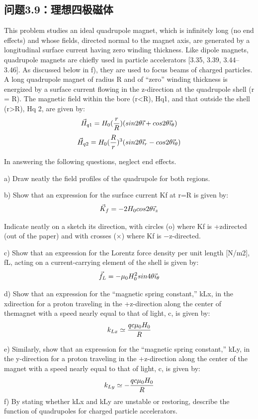 \subsection{问题3.9：理想四极磁体}
This problem studies an ideal quadrupole magnet, which is infinitely long (no end
effects) and whose fields, directed normal to the magnet axis, are generated by a
longitudinal surface current having zero winding thickness. Like dipole magnets,
quadrupole magnets are chiefly used in particle accelerators [3.35, 3.39, 3.44–3.46].
As discussed below in f), they are used to focus beams of charged particles.
A long quadrupole magnet of radius R and of “zero” winding thickness is energized
by a surface current flowing in the z-direction at the quadrupole shell (r = R).
The magnetic field within the bore (r<R), Hq1, and that outside the shell (r>R),
Hq
2, are given by:
$$
\vec{H}_{q1}=H_{0}(\frac{r}{R})(sin2\theta\vec{\imath}+cos2\theta\vec{\imath}_{\theta})\\%
$$
$$
\vec{H}_{q2}=H_{0}(\frac{R}{r})^{3}(sin2\theta\vec{\imath}_{r}-cos2\theta\vec{\imath}_{\theta})\\%
$$

In answering the following questions, neglect end effects.

a) Draw neatly the field profiles of the quadrupole for both regions.

b) Show that an expression for the surface current Kf at r=R is given by:
$$
\vec{K}_{f}=-2H_{0}cos2\theta\vec{\imath}_{z}\\%
$$

Indicate neatly on a sketch its direction, with circles (o) where Kf is +zdirected (out of the paper) and with crosses (×) where Kf is −z-directed.

c) Show that an expression for the Lorentz force density per unit length [N/m2],
fL, acting on a current-carrying element of the shell is given by:
$$
\vec{f}_{L}=-\mu_{0}H_{0}^{2}sin4\theta\vec{\imath}_{\theta}\\%
$$

d) Show that an expression for the “magnetic spring constant,” kLx, in the xdirection for a proton traveling in the +z-direction along the center of themagnet with a speed nearly equal to that of light, c, is given by:
$$
k_{Lx}\simeq\frac{qc\mu_{0}H_{0}}{R}\\%
$$

e) Similarly, show that an expression for the “magnetic spring constant,” kLy,
in the y-direction for a proton traveling in the +z-direction along the center
of the magnet with a speed nearly equal to that of light, c, is given by:
$$
k_{Ly}\simeq-\frac{qc\mu_{0}H_{0}}{R}\\%
$$
f) By stating whether kLx and kLy are unstable or restoring, describe the function of quadrupoles for charged particle accelerators.

